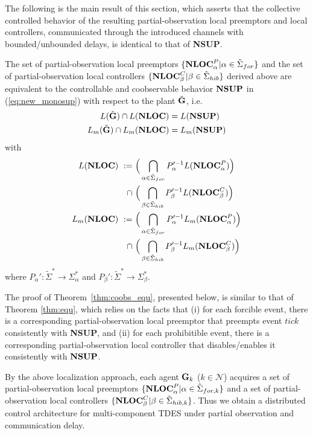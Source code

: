 The following is the main result of this section, which asserts that the collective controlled
behavior of the resulting partial-observation local preemptors and local controllers, communicated
through the introduced channels with bounded/unbounded delays, is identical to that of {\bf NSUP}.

\begin{theorem} \label{thm:coobs_equ}
The set of partial-observation local preemptors $\{{\bf NLOC}_{\alpha}^P|\alpha \in
\tilde\Sigma_{for} \}$ and the set of partial-observation local
controllers $\{{\bf NLOC}_{\beta}^C|\beta \in \tilde\Sigma_{hib}\}$ derived above
are equivalent to the controllable and coobservable behavior ${\bf NSUP}$ in (\ref{eq:new_monosup}) with respect to
the plant $\tilde{\bf G}$, i.e.
\begin{align}
   L(\tilde{\bf G}) \cap L(\bf NLOC)  &= L(\bf NSUP) \label{eq:sub1:coobsequv}\\
   L_m(\tilde{\bf G}) \cap L_m(\bf NLOC)  &= L_m(\bf NSUP) \label{eq:sub2:coobsequv}
\end{align}
with
\begin{align}
L(\bf NLOC)~:=~ &\Big(\mathop \bigcap\limits_{\alpha \in \tilde\Sigma_{for}}P_{\alpha}'^{-1}L({\bf NLOC}^P_{\alpha}) \Big)\notag\\
           \cap~ &\Big(\mathop \bigcap\limits_{\beta \in \tilde\Sigma_{hib}}P_{\beta}'^{-1}L({\bf NLOC}^C_{\beta}) \Big) \label{eq:sub1:newloc}\\
L_m(\bf NLOC)~:=~ &\Big(\mathop \bigcap\limits_{\alpha \in \tilde\Sigma_{for}}P_{\alpha}'^{-1}L_m({\bf NLOC}^P_{\alpha})\Big)\notag\\
            \cap~ &\Big(\mathop \bigcap\limits_{\beta \in \tilde\Sigma_{hib}}P_{\beta}'^{-1}L_m({\bf NLOC}^C_{\beta}) \Big) \label{eq:sub2:newloc}
\end{align}
where $P_{\alpha}': \tilde\Sigma^* \rightarrow \Sigma_{\alpha}^*$
and $P_{\beta}': \tilde\Sigma^* \rightarrow \Sigma_{\beta}^*$.
\end{theorem}

The proof of Theorem~\ref{thm:coobs_equ}, presented below, is similar to that of Theorem
\ref{thm:equ}, which relies on the facts that (i) for each forcible
event, there is a corresponding partial-observation local preemptor that
preempts event $tick$ consistently with {\bf NSUP}, and (ii)
for each prohibitible event, there is a corresponding partial-observation
local controller that disables/enables it consistently with
${\bf NSUP}$. 

By the above localization approach, each agent ${\bf G}_k$ ($k \in \mathcal{N}$) acquires
a set of partial-observation local preemptors $\{{\bf NLOC}_{\alpha}^P | \alpha \in \tilde\Sigma_{for,k} \}$
and a set of partial-observation local controllers $\{{\bf NLOC}_{\beta}^C | \beta \in \tilde\Sigma_{hib,k} \}$.
Thus we obtain a distributed control architecture for multi-component TDES under partial observation and communication delay.

